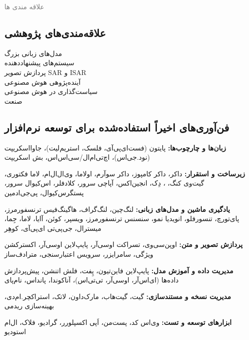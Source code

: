 \documentclass[a4paper]{deedy-persian} %
\begin{document}
\begin{minipage}[t]{0.33\textwidth} %
\small
\textcolor{gray}{\huge{علاقه مندی ها}}
\vspace{\itemsep}

\subsection*{علاقه‌مندی‌های پژوهشی}
مدل‌های زبانی بزرگ\\
سیستم‌های پیشنهاددهنده\\
پردازش تصویر SAR و ISAR\\
آینده‌پژوهی هوش مصنوعی\\
سیاست‌گذاری در هوش مصنوعی\\
صنعت \\

\sectionspace %
\subsection*{فن‌آوری‌های اخیراً استفاده‌شده برای توسعه نرم‌افزار}
\textbf{زبان‌ها و چارچوب‌ها:}  
پایتون (فست‌ای‌پی‌آی، فلسک، استریم‌لیت)، جاوااسکریپت (نود.جی‌اس)، اچ‌تی‌ام‌ال/سی‌اس‌اس، بش اسکریپت  

\textbf{زیرساخت و استقرار:}  
داکر، داکر کامپوز، داکر سوآرم، اولاما، وی‌ال‌ال‌ام، لاما فکتوری، گیت‌وی کنگ، ، دِک، انجین‌اکس، آپاچی سرور، کلادفلر، اس‌کیوال سرور، پستگرس‌کیوال، پی‌جی‌ادمین

\textbf{یادگیری ماشین و مدل‌های زبانی:}  
لنگ‌چین، لنگ‌گراف، هاگینگ‌فیس ترنسفورمرز، پای‌تورچ، تنسورفلو، انویدیا نمو، سنسنس ترنسفورمرز، ویسپر، کوئن، آایا، لاما، جِما، میسترال، جی‌پی‌تی ای‌پی‌آی، کوهِر  

\textbf{پردازش تصویر و متن:}  
اوپن‌سی‌وی، تسراکت او‌سی‌آر، پایپ‌لاین او‌سی‌آر، اکسترکشن ویژگی، سامرایزر، سرویس اعتبارسنجی، مترادف‌ساز  

\textbf{مدیریت داده و آموزش مدل:}  
پایپ‌لاین فاین‌تیون، پِفت، فلش اتنشن، پیش‌پردازش داده‌ها (ای‌اس‌آر، او‌سی‌آر، تی‌تی‌اس)، آناکوندا، پانداس، نام‌پای  

\textbf{مدیریت نسخه و مستندسازی:}  
گیت، گیت‌هاب، مارک‌داون، لاتک، استراکچر.ام‌دی، بهینه‌سازی ریدمی  

\textbf{ابزارهای توسعه و تست:}  
وی‌اس کد، پست‌من، اَپی اکسپلورر، گرادیو، فلاک، ال‌ام استودیو  

\sectionspace %



\end{minipage}
\end{document}

